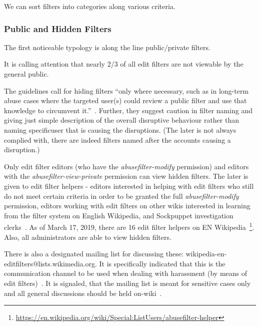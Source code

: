 \documentclass{sigchi}
\begin{document}
We can sort filters into categories along various criteria.

\subsubsection{Public and Hidden Filters}

The first noticeable typology is along the line public/private filters.

It is calling attention that nearly 2/3 of all edit filters are not viewable by the general public.

The guidelines call for hiding filters ``only where necessary, such as in long-term abuse cases where the targeted user(s) could review a public filter and use that knowledge to circumvent it.''~\cite{Wikipedia:EditFilter}.
Further, they suggest caution in filter naming and giving just simple description of the overall disruptive behaviour rather than naming specificuser that is causing the disruptions.
(The later is not always complied with, there are indeed filters named after the accounts causing a disruption.)

Only edit filter editors (who have the \emph{abusefilter-modify} permission) and editors with the \emph{abusefilter-view-private} permission can view hidden filters.
The later is given to edit filter helpers - editors interested in helping with edit filters who still do not meet certain criteria in order to be granted the full \emph{abusefilter-modify} permission, editors working with edit filters on other wikis interested in learning from the filter system on English Wikipedia, and Sockpuppet investigation clerks~\cite{Wikipedia:EditFilterHelper}.
As of March 17, 2019, there are 16 edit filter helpers on EN Wikipedia~\footnote{\url{https://en.wikipedia.org/wiki/Special:ListUsers/abusefilter-helper}}.
Also, all administrators are able to view hidden filters.

There is also a designated mailing list for discussing these: wikipedia-en-editfilters@lists.wikimedia.org.
It is specifically indicated that this is the communication channel to be used when dealing with harassment (by means of edit filters)~\cite{Wikipedia:EditFilter}.
It is signaled, that the mailing list is meant for sensitive cases only and all general discussions should be held on-wiki~\cite{Wikipedia:EditFilter}.
\end{document}
